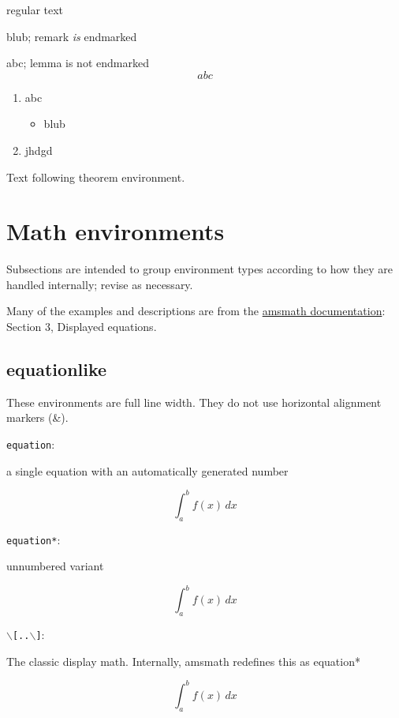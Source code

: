 \documentclass[leqno]{article}
\newcommand{\testtype}[2]{\texttt{#1}:%
  #2}
\newcommand{\makeoutertest}[3]{
  \begin{test}
    \testtype{#1}{#2}
    #3
  \end{test}
}
\newcommand{\maketest}[3]{
  \makeoutertest{#1}{#2}{
    \begin{#1}
      #3
    \end{#1}
  }
}
\begin{document}
\begin{theorem}
  regular text
  \begin{remark}
    blub; remark \emph{is} endmarked
  \end{remark}
  \begin{lemma}
    abc; lemma is not endmarked
    \begin{equation*}
      abc
    \end{equation*}
    \begin{enumerate}
    \item abc
      \begin{itemize}
      \item blub
      \end{itemize}
    \item jhdgd
    \end{enumerate}
  \end{lemma}
\end{theorem}


Text following theorem environment.
\emph{\color{gray}\kant*[1][1-2]}


\clearpage

\section{Math environments}

Subsections are intended to group environment types according to how they are handled internally; revise as necessary.

Many of the examples and descriptions are from  the \href{https://www.ams.org/arc/tex/amsmath/amsldoc.pdf}{amsmath documentation}: Section 3, Displayed equations.

\subsection{equationlike}

These environments are full line width.
They do not use horizontal alignment markers (\&).

\maketest{equation}{
  a single equation with an automatically generated number
}{
  \int_a^b f(x)\, dx
}
\maketest{equation*}{
  unnumbered variant
}{
  \int_a^b f(x)\, dx
}
\makeoutertest{$\backslash$[..$\backslash$]}{
  The classic display math.
  Internally, amsmath redefines this as equation*
}{
  \[
    \int_a^b f(x)\, dx
  \]
}
\end{document}
